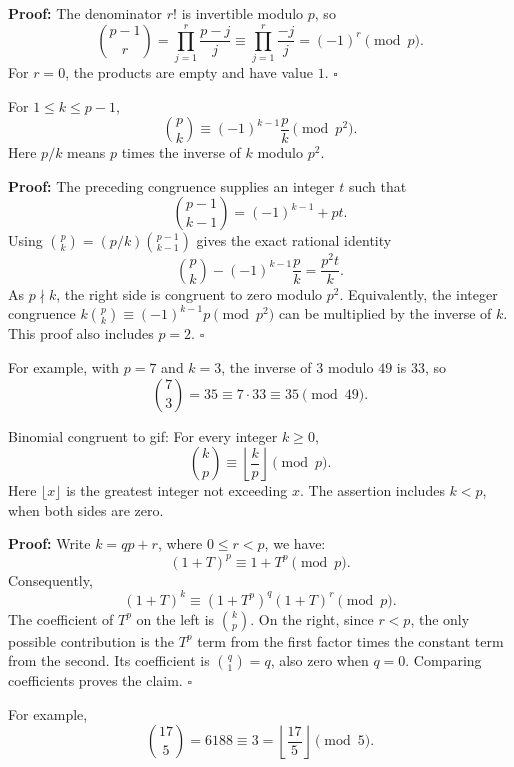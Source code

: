 \documentclass[a4paper,11pt,abstracton]{scrartcl}
\theoremstyle{dotlessP}
\theoremstyle{dotlessS}
\theoremstyle{remark}
\theoremstyle{definition}
\begin{document}
\textbf{Proof:}
The denominator $r!$ is invertible modulo $p$, so
\[
    \binom{p-1}r
      =\prod_{j=1}^{r}\frac{p-j}{j}
      \equiv\prod_{j=1}^{r}\frac{-j}{j}=(-1)^r\pmod p.
\]
For $r=0$, the products are empty and have value $1$.
\hfill$\square$


\begin{remark_box}
For $1\leq k\leq p-1$,
\[
    \boxed{\binom pk\equiv(-1)^{k-1}\frac pk\pmod{p^2}.}
\]
Here $p/k$ means $p$ times the inverse of $k$ modulo $p^2$.
\end{remark_box}

\textbf{Proof:}
The preceding congruence supplies an integer $t$ such that
\[
    \binom{p-1}{k-1}=(-1)^{k-1}+pt.
\]
Using $\binom pk=(p/k)\binom{p-1}{k-1}$ gives the exact rational identity
\[
    \binom pk-(-1)^{k-1}\frac pk=\frac{p^2t}{k}.
\]
As $p\nmid k$, the right side is congruent to zero modulo $p^2$.
Equivalently, the integer congruence
$k\binom pk\equiv(-1)^{k-1}p\pmod{p^2}$ can be multiplied by
the inverse of $k$. This proof also includes $p=2$.
\hfill$\square$



\begin{example_box}
For example, with $p=7$ and $k=3$, the inverse of $3$ modulo $49$
is $33$, so
\[
    \binom73=35\equiv7\cdot33\equiv35\pmod{49}.
\]
\end{example_box}


\begin{mainbox}{Binomial congruent to gif:}
For every integer $k\geq0$,
\[
    \boxed{\binom kp\equiv\left\lfloor\frac{k}{p}\right\rfloor
      \pmod p.}
\]
Here $\lfloor x\rfloor$ is the greatest integer not exceeding $x$.
The assertion includes $k<p$, when both sides are zero.
\end{mainbox}

\textbf{Proof:}
Write $k=qp+r$, where $0\leq r<p$, we have:
\[
    (1+T)^p\equiv1+T^p\pmod p.
\]
Consequently,
\[
    (1+T)^k\equiv(1+T^p)^q(1+T)^r\pmod p.
\]
The coefficient of $T^p$ on the left is $\binom kp$.
On the right, since $r<p$, the only possible contribution is the
$T^p$ term from the first factor times the constant term from the
second. Its coefficient is $\binom q1=q$, also zero when $q=0$.
Comparing coefficients proves the claim.
\hfill$\square$



\begin{example_box}
For example,
\[
    \binom{17}{5}=6188\equiv3
      =\left\lfloor\frac{17}{5}\right\rfloor\pmod5.
\]
\end{example_box}
\end{document}
